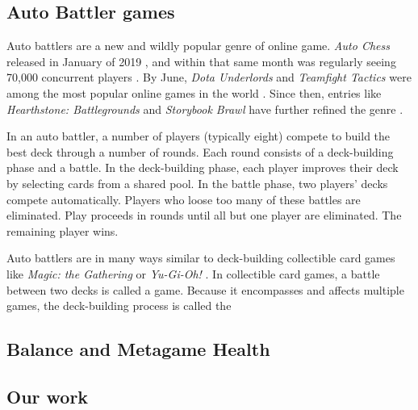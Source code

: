 \subsection{Auto Battler games}

Auto battlers are a new and wildly popular genre of online game.
\textit{Auto Chess} released in January of 2019 \cite{autochess}, and
within that same month was regularly seeing 70,000 concurrent players
\cite{auto-chess-what-and-why}. By June, \textit{Dota Underlords} and
\textit{Teamfight Tactics} were among the most popular online games in
the world \cite{autobattler-popularity}. Since then, entries like
\textit{Hearthstone: Battlegrounds} and \textit{Storybook Brawl} have
further refined the genre \cite{hearthstone-battlegrounds,
storybook-brawl}.



In an auto battler, a number of players (typically eight) compete to
build the best deck through a number of rounds. Each round consists of
a deck-building phase and a battle. In the deck-building phase, each
player improves their deck by selecting cards from a shared pool. In
the battle phase, two players' decks compete automatically. Players
who loose too many of these battles are eliminated. Play proceeds in
rounds until all but one player are eliminated. The remaining player
wins.

Auto battlers are in many ways similar to deck-building collectible
card games like \textit{Magic: the Gathering} or \textit{Yu-Gi-Oh!}
\cite{magic-the-gathering, yugioh-tcg}. In collectible card games, a
battle between two decks is called a game. Because it encompasses and
affects multiple games, the deck-building process is called the

\subsection{Balance and Metagame Health}




\subsection{Our work}





